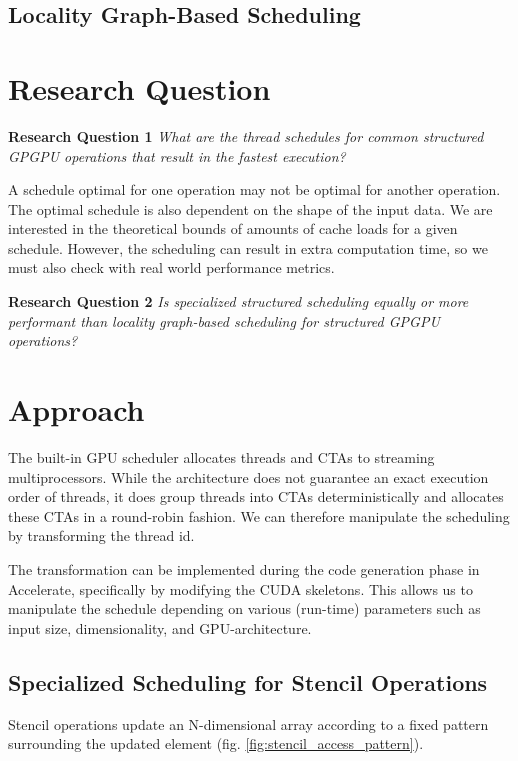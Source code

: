 \documentclass{article}
\newcommand{\TODO}[1]{\noindent{\color{red}\textbf{[TODO] #1}}}
\begin{document}
\begin{multicols}{2}
\subsection{Locality Graph-Based Scheduling}
\TODO{Explain PAVER}
\cite{tripathy2021paver}

\section{Research Question}

\begin{mdframed}
    \textbf{Research Question 1}
    \emph{What are the thread schedules for common structured GPGPU operations that result in the fastest execution?}
\end{mdframed}
A schedule optimal for one operation may not be optimal for another operation.
The optimal schedule is also dependent on the shape of the input data.
We are interested in the theoretical bounds of amounts of cache loads for a given schedule.
However, the scheduling can result in extra computation time, so we must also check with real world performance metrics.

\begin{mdframed}
    \textbf{Research Question 2}
    \emph{Is specialized structured scheduling equally or more performant than locality graph-based scheduling for structured GPGPU operations?}
\end{mdframed}
\TODO{Text}


\section{Approach}
The built-in GPU scheduler allocates threads and CTAs to streaming multiprocessors.
While the architecture does not guarantee an exact execution order of threads, it does group threads into CTAs deterministically and allocates these CTAs in a round-robin fashion.
We can therefore manipulate the scheduling by transforming the thread id.

The transformation can be implemented during the code generation phase in Accelerate, specifically by modifying the CUDA skeletons.
This allows us to manipulate the schedule depending on various (run-time) parameters such as input size, dimensionality, and GPU-architecture.

\subsection{Specialized Scheduling for Stencil Operations}
Stencil operations update an N-dimensional array according to a fixed pattern surrounding the updated element (fig. \ref{fig:stencil_access_pattern}).


\end{multicols}
\end{document}
